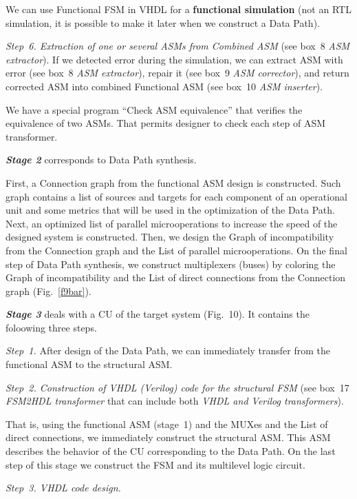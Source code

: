 \begin{multicols}{2}
   We can use Functional FSM in VHDL for a \textbf{function\-al simulation} (not an RTL simulation, it
is possible to make it later when we construct a Data Path).

\textit{Step~6. Extraction of one or several ASMs from Combined ASM} (see box~8
\textit{ASM extractor}). If we
detected error during the simulation, we can extract ASM with error
(see box~8 \textit{ASM extractor}), repair it
(see box~9 \textit{ASM corrector}),
and return corrected ASM into combined Functional ASM (see box~10 \textit{ASM
inserter}).

We have a special program ``Check ASM equivalence'' that verifies the equivalence of two ASMs. That
permits designer to check each step of ASM transformer.
{

}


{\bfseries\textit{Stage 2}} corresponds to Data Path synthesis.  

 First, a Connection graph from the functional ASM design is constructed. Such graph contains a list of
sources and targets for each component of an oper\-ation\-al unit and some metrics that will be used in the
optimization of the Data Path. Next, an optimized list of parallel microoperations to increase the speed of the
designed system is constructed. Then, we design the Graph of incompatibility from the Connection graph and the
List of parallel microoperations. On the final step of Data Path synthesis,
we construct multiplexers (buses) by
coloring the Graph of incompatibility and the List of direct connections from the Connection graph
(Fig.~\ref{f9bar}).

{\bfseries\textit{Stage 3}} deals with a CU of the target system (Fig.~10). 
It contains the foloowing three steps.

\textit{Step~1.} After design of the Data Path, we can immediately transfer from the functional ASM to the
structural ASM.

\textit{Step~2. Construction of VHDL (Verilog) code for the structural FSM}
(see box~17 \textit{FSM2HDL transformer} that can include both \textit{VHDL and Verilog transformers}).

That is, using the functional ASM (stage~1) and the MUXes and the List of direct connections,
we immediately
construct the structural ASM. This ASM describes the behavior of the CU corresponding to the Data
Path. 
On the last step of this stage we construct the FSM
and its multilevel logic circuit.

\textit{Step~3. VHDL code design. }


\end{multicols}
